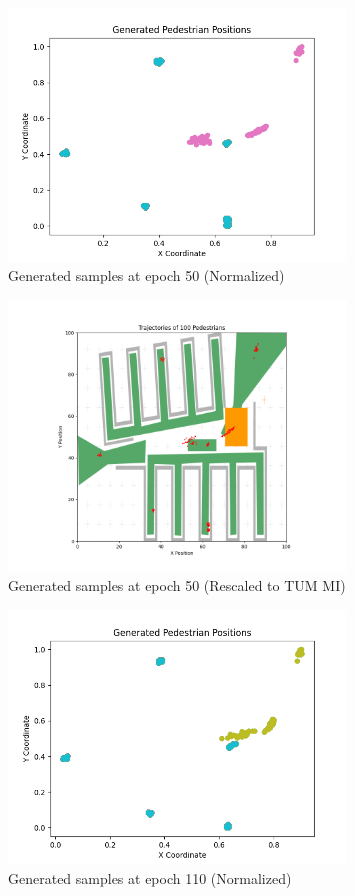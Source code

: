 \documentclass[10pt,a4paper]{article}
\begin{document}
\begin{figure}[H]
    \centering
    \includegraphics[width=0.8\textwidth]{Images/nomalized_epoch50.png}
    \caption{Generated samples at epoch 50 (Normalized)}
    \label{fig:epoch50_norm}
\end{figure}

\begin{figure}[H]
    \centering
    \includegraphics[width=0.8\textwidth]{Images/pedestrians_trajectories_epoch50.png}
    \caption{Generated samples at epoch 50 (Rescaled to TUM MI)}
    \label{fig:epoch50_real}
\end{figure}

\begin{figure}[h]
    \centering
    \includegraphics[width=0.8\textwidth]{Images/nomalized_epoch110.png}
    \caption{Generated samples at epoch 110 (Normalized)}
    \label{fig:epoch110_norm}
\end{figure}
\end{document}
